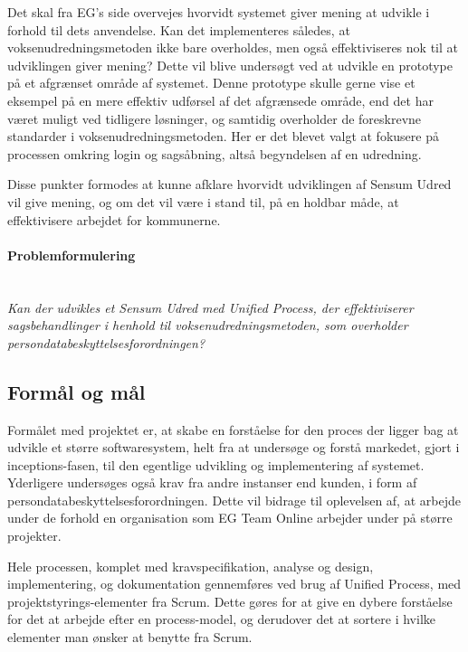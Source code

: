 \documentclass[../main.tex]{subfiles}
\begin{document}
Det skal fra EG's side overvejes hvorvidt systemet giver mening at udvikle i forhold til dets anvendelse. Kan det implementeres således, at voksenudredningsmetoden ikke bare overholdes, men også effektiviseres nok til at udviklingen giver mening? Dette vil blive undersøgt ved at udvikle en prototype på et afgrænset område af systemet. Denne prototype skulle gerne vise et eksempel på en mere effektiv udførsel af det afgrænsede område, end det har været muligt ved tidligere løsninger, og samtidig overholder de foreskrevne standarder i voksenudredningsmetoden. Her er det blevet valgt at fokusere på processen omkring login og sagsåbning, altså begyndelsen af en udredning. 

Disse punkter formodes at kunne afklare hvorvidt udviklingen af Sensum Udred vil give mening, og om det vil være i stand til, på en holdbar måde, at effektivisere arbejdet for kommunerne. 


\paragraph{Problemformulering}\mbox{} \\
\textsl{Kan der udvikles et Sensum Udred med Unified Process, der effektiviserer sagsbehandlinger i henhold til voksenudredningsmetoden, som overholder persondatabeskyttelsesforordningen?}


\subsection{Formål og mål}
Formålet med projektet er, at skabe en forståelse for den proces der ligger bag at udvikle et større softwaresystem, helt fra at undersøge og forstå markedet, gjort i inceptions-fasen, til den egentlige udvikling og implementering af systemet.
Yderligere undersøges også krav fra andre instanser end kunden, i form af persondatabeskyttelsesforordningen. Dette vil bidrage til oplevelsen af, at arbejde under de forhold en organisation som EG Team Online arbejder under på større projekter.

Hele processen, komplet med kravspecifikation, analyse og design, implementering, og dokumentation gennemføres ved brug af Unified Process, med projektstyrings-elementer fra Scrum. Dette gøres for at give en dybere forståelse for det at arbejde efter en process-model, og derudover det at sortere i hvilke elementer man ønsker at benytte fra Scrum. 
\end{document}
